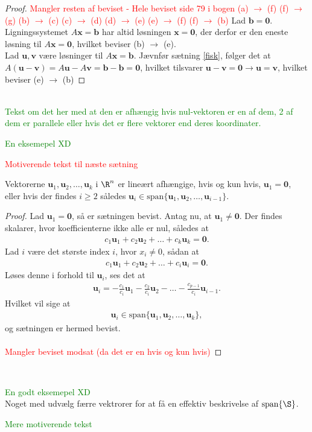 %
\begin{proof}
%
\textcolor{red}{Mangler resten af beviset - Hele beviset side 79 i bogen
%
(a) $\rightarrow$ (f)
(f) $\rightarrow$ (g)
(b) $\rightarrow$ (c)
(c) $\rightarrow$ (d)
(d) $\rightarrow$ (e)
(e) $\rightarrow$ (f)
(f) $\rightarrow$ (b)
%
}
Lad $\mathbf{b}=\mathbf{0}$. 
Ligningssystemet $A\mathbf{x}=\mathbf{b}$ har altid løsningen $\mathbf{x}=\mathbf{0}$, der derfor er den eneste løsning til $A\mathbf{x}=\mathbf{0}$, hvilket beviser (b) $\rightarrow$ (e).
\\
Lad $\mathbf{u}, \mathbf{v}$ være løsninger til $A\mathbf{x}=\mathbf{b}$.
Jævnfør sætning \ref{fisk}, følger det at $A(\mathbf{u}-\mathbf{v})=A\mathbf{u}-A\mathbf{v}=\mathbf{b}-\mathbf{b}=\mathbf{0}$, hvilket tilsvarer $\mathbf{u}-\mathbf{v}=\mathbf{0}
\rightarrow  
\mathbf{u} =\mathbf{v}$, hvilket beviser (e) $\rightarrow$ (b)
%
%
\end{proof}
\\
%
\textcolor{green}{Tekst om det her med at den er afhængig hvis nul-vektoren er en af dem, 2 af dem er parallele eller hvis det er flere vektorer end deres koordinater.}
\\
%
\begin{eks}
\textcolor{green}{En eksemepel XD}
\end{eks}
%
\textcolor{red}{Motiverende tekst til næste sætning}
%
\begin{thm}{}{}
%
Vektorerne $\mathbf{u}_1,\mathbf{u}_2, \ldots ,\mathbf{u}_k$ i $\R^n$ er lineært afhængige, 
hvis og kun hvis, $\mathbf{u}_1=\mathbf{0}$, eller hvis der findes $i \geq 2$ således $\mathbf{u}_i \in \text{span} \{ \mathbf{u}_1,\mathbf{u}_2, \ldots ,\mathbf{u}_{i-1} \}$.
%
\end{thm}
%
\begin{proof}
%
Lad $\mathbf{u}_1=\mathbf{0}$, så er sætningen bevist. 
Antag nu, at $\mathbf{u}_1 \neq \mathbf{0}$. 
Der findes skalarer, hvor koefficienterne ikke alle er nul, således at
% 
\begin{align*}
c_1 \mathbf{u}_1 + c_2 \mathbf{u}_2 + \ldots + c_k \mathbf{u}_k = \mathbf{0}.
\end{align*}
%
Lad $i$ være det største index $i$, hvor $x_i \neq 0$, sådan at 
\begin{align*}
c_1 \mathbf{u}_1 + c_2 \mathbf{u}_2 + \ldots + c_i \mathbf{u}_i = \mathbf{0}.
\end{align*}
Løses denne i forhold til $\mathbf{u}_i$, ses det at
\begin{align*}
\mathbf{u}_i = - \frac{c_1}{c_i} \mathbf{u}_1 - \frac{c_2}{c_i} \mathbf{u}_2 - \ldots - \frac{c_{p-1}}{c_i} \mathbf{u}_{i-1}.
\end{align*}
Hvilket vil sige at 
\begin{align*}
\mathbf{u}_i \in \text{span}\{ \mathbf{u}_1,\mathbf{u}_2, \ldots ,\mathbf{u}_k \},
\end{align*}
%
og sætningen er hermed bevist.
%
\\\\
\textcolor{red}{Mangler beviset modsat (da det er en hvis og kun hvis)}
%
\end{proof}
\\
%
%
\begin{eks}
\textcolor{green}{En godt eksemepel XD} 
\\
Noget med udvælg færre vektrorer for at få en effektiv beskrivelse af $\text{span}\{\S\}$.
\end{eks}
%
\textcolor{green}{Mere motiverende tekst}